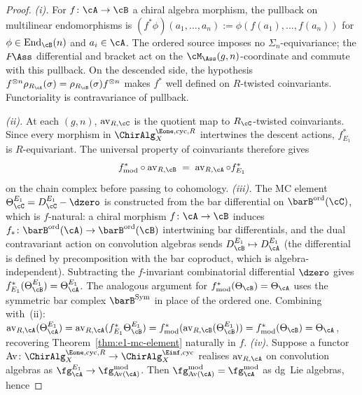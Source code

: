\begin{proof}
\emph{(i).} For $f\colon \cA \to \cB$ a chiral algebra morphism,
the pullback on multilinear endomorphisms is
$(f^* \phi)(a_1, \ldots, a_n) := \phi(f(a_1), \ldots, f(a_n))$ for
$\phi \in \operatorname{End}_\cB(n)$ and $a_i \in \cA$. The ordered
source imposes no $\Sigma_n$-equivariance; the $F\!\Ass$ differential
and bracket act on the $\cM_{\Ass}(g,n)$-coordinate and commute with
this pullback. On the descended side, the hypothesis
$f^{\otimes n}\rho_{R_\cA}(\sigma)=\rho_{R_\cB}(\sigma)f^{\otimes n}$
makes $f^*$ well defined on $R$-twisted coinvariants. Functoriality is
contravariance of pullback.

\emph{(ii).} At each $(g,n)$, $\operatorname{av}_{R,\cC}$ is the
quotient map to $R_\cC$-twisted coinvariants. Since every morphism in
$\ChirAlg^{\Eone,\mathrm{cyc},R}_X$ intertwines the descent actions,
$f^*_{E_1}$ is $R$-equivariant. The universal property of coinvariants
therefore gives
\[
f^*_{\mathrm{mod}}\circ \operatorname{av}_{R,\cB}
\;=\;
\operatorname{av}_{R,\cA}\circ f^*_{E_1}
\]
on the chain complex before passing to cohomology.
\emph{(iii).} The MC element $\Theta^{E_1}_\cC = D_\cC^{E_1} -
\dzero$ is constructed from the bar differential on
$\barB^{\mathrm{ord}}(\cC)$, which is $f$-natural: a chiral
morphism $f\colon \cA \to \cB$ induces $f_*\colon
\barB^{\mathrm{ord}}(\cA) \to \barB^{\mathrm{ord}}(\cB)$
intertwining bar differentials, and the dual contravariant
action on convolution algebras sends
$D^{E_1}_\cB \mapsto D^{E_1}_\cA$ \textup{(}the differential is
defined by precomposition with the bar coproduct, which is
algebra-independent\textup{)}. Subtracting the $f$-invariant
combinatorial differential $\dzero$ gives
$f^*_{E_1}(\Theta^{E_1}_\cB) = \Theta^{E_1}_\cA$. The
analogous argument for $f^*_{\mathrm{mod}}(\Theta_\cB) =
\Theta_\cA$ uses the symmetric bar complex
$\barB^{\mathrm{Sym}}$ in place of the ordered one. Combining
with~(ii): $\operatorname{av}_{R,\cA}(\Theta^{E_1}_\cA) =
\operatorname{av}_{R,\cA}(f^*_{E_1}\Theta^{E_1}_\cB) =
f^*_{\mathrm{mod}}(\operatorname{av}_{R,\cB}(\Theta^{E_1}_\cB)) =
f^*_{\mathrm{mod}}(\Theta_\cB) = \Theta_\cA$, recovering
Theorem~\textup{\ref{thm:e1-mc-element}} naturally in $f$.
\emph{(iv).} Suppose a functor
$\mathrm{Av}\colon \ChirAlg^{\Eone,\mathrm{cyc},R}_X \to
\ChirAlg^{\Einf,\mathrm{cyc}}_X$ realises $\operatorname{av}_{R,\cA}$
on convolution algebras as
$\fg^{E_1}_\cA \to \fg^{\mathrm{mod}}_{\mathrm{Av}(\cA)}$. Then
$\fg^{\mathrm{mod}}_{\mathrm{Av}(\cA)} =
\fg^{\mathrm{mod}}_\cA$ as dg~Lie algebras, hence

\end{proof}

